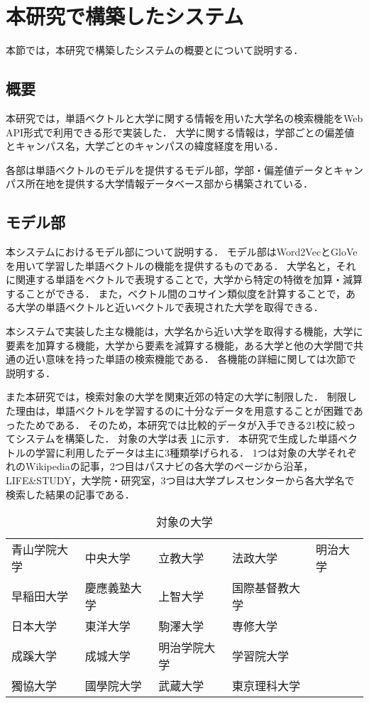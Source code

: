 \section{本研究で構築したシステム}
本節では，本研究で構築したシステムの概要とについて説明する．
\subsection{概要}
本研究では，単語ベクトルと大学に関する情報を用いた大学名の検索機能をWeb API形式で利用できる形で実装した．
大学に関する情報は，学部ごとの偏差値とキャンパス名，大学ごとのキャンパスの緯度経度を用いる．

各部は単語ベクトルのモデルを提供するモデル部，学部・偏差値データとキャンパス所在地を提供する大学情報データベース部から構築されている．


\subsection{モデル部}
本システムにおけるモデル部について説明する．
モデル部はWord2VecとGloVeを用いて学習した単語ベクトルの機能を提供するものである．
大学名と，それに関連する単語をベクトルで表現することで，大学から特定の特徴を加算・減算することができる．
また，ベクトル間のコサイン類似度を計算することで，ある大学の単語ベクトルと近いベクトルで表現された大学を取得できる．

本システムで実装した主な機能は，大学名から近い大学を取得する機能，大学に要素を加算する機能，大学から要素を減算する機能，ある大学と他の大学間で共通の近い意味を持った単語の検索機能である．
各機能の詳細に関しては次節で説明する．

また本研究では，検索対象の大学を関東近郊の特定の大学に制限した．
制限した理由は，単語ベクトルを学習するのに十分なデータを用意することが困難であったためである．
そのため，本研究では比較的データが入手できる21校に絞ってシステムを構築した．
対象の大学は表 \ref{table:univs}に示す．
本研究で生成した単語ベクトルの学習に利用したデータは主に3種類挙げられる．
1つは対象の大学それぞれのWikipediaの記事，2つ目はパスナビの各大学のページから沿革，LIFE\&STUDY，大学院・研究室，3つ目は大学プレスセンターから各大学名で検索した結果の記事である．

\begin{table}[htbp]
\caption{対象の大学}
\centering
\begin{tabular}{|lllll|}
\hline
青山学院大学 & 中央大学 & 立教大学 & 法政大学 & 明治大学\\
早稲田大学 & 慶應義塾大学 & 上智大学 & 国際基督教大学 & \\
日本大学 & 東洋大学 & 駒澤大学 & 専修大学 & \\
成蹊大学 & 成城大学 & 明治学院大学 & 学習院大学 & \\
獨協大学 & 國學院大学 & 武蔵大学 & 東京理科大学 & \\  \hline
\end{tabular}
\label{table:univs}
\end{table}

